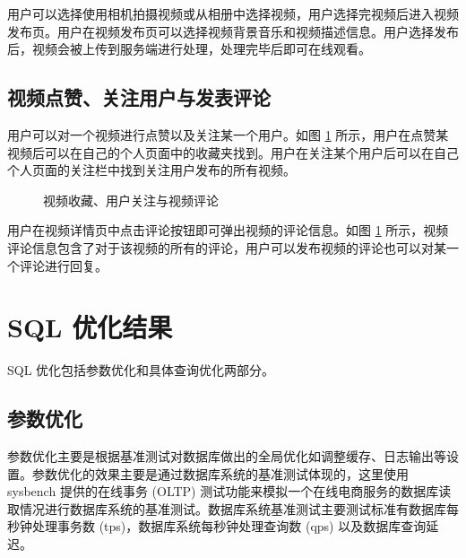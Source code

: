 用户可以选择使用相机拍摄视频或从相册中选择视频，用户选择完视频后进入视频发布页。用户在视频发布页可以选择视频背景音乐和视频描述信息。用户选择发布后，视频会被上传到服务端进行处理，处理完毕后即可在线观看。

\subsection{视频点赞、关注用户与发表评论}

用户可以对一个视频进行点赞以及关注某一个用户。如图 \ref{fig:LikeWatch} 所示，用户在点赞某视频后可以在自己的个人页面中的收藏夹找到。用户在关注某个用户后可以在自己个人页面的关注栏中找到关注用户发布的所有视频。

\begin{figure}[!ht]
\centering
{}\quad
{}\quad
{}
\caption{视频收藏、用户关注与视频评论}
\label{fig:LikeWatch}
\end{figure}

用户在视频详情页中点击评论按钮即可弹出视频的评论信息。如图 \ref{fig:LikeWatch} 所示，视频评论信息包含了对于该视频的所有的评论，用户可以发布视频的评论也可以对某一个评论进行回复。

%
%



\section{SQL 优化结果}
SQL 优化包括参数优化和具体查询优化两部分。

\subsection{参数优化}
参数优化主要是根据基准测试对数据库做出的全局优化如调整缓存、日志输出等设置。参数优化的效果主要是通过数据库系统的基准测试体现的，这里使用 sysbench\cite{sysbench2019} 提供的在线事务 (OLTP) 测试功能来模拟一个在线电商服务的数据库读取情况进行数据库系统的基准测试。数据库系统基准测试主要测试标准有数据库每秒钟处理事务数 (tps)，数据库系统每秒钟处理查询数 (qps) 以及数据库查询延迟。

